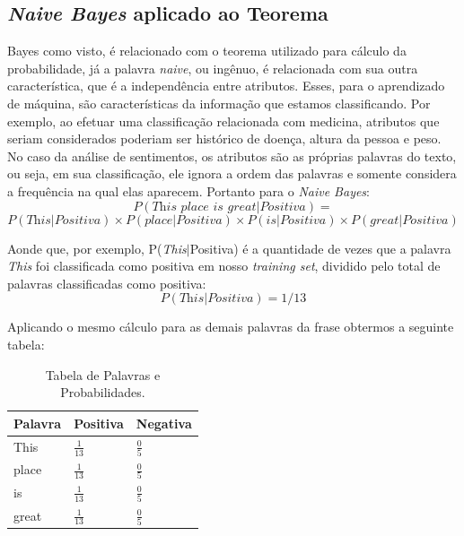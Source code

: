 \subsection{\textit{Naive Bayes} aplicado ao Teorema}

Bayes como visto, é relacionado com o teorema utilizado para cálculo da
probabilidade, já a palavra \textit{naive}, ou ingênuo, é relacionada com sua
outra característica, que é a
independência entre atributos. Esses, para o aprendizado de máquina, são
características da informação que estamos classificando. Por exemplo, ao efetuar uma classificação relacionada com medicina, atributos que seriam considerados poderiam ser histórico de doença, altura da pessoa e peso. No caso da análise de sentimentos, os atributos
são as próprias palavras do texto, ou seja, em sua classificação, ele ignora a
ordem das palavras e somente considera a frequência na qual elas aparecem.
Portanto para o \textit{Naive Bayes}:
\[ P(\textit{This place is great}|Positiva) =\]\[ P(\textit{This}|Positiva) \times
P(\textit{place}|Positiva) \times P(\textit{is}|Positiva) \times
P(\textit{great}|Positiva)
\]

Aonde que, por exemplo, P(\textit{This}$\vert$Positiva) é a quantidade de vezes que a
palavra \textit{This} foi classificada como positiva em nosso \textit{training
set}, dividido pelo total de palavras classificadas como positiva:
\[P(\textit{This}|Positiva) = 1 / 13\]

Aplicando o mesmo cálculo para as demais palavras da frase obtermos a seguinte
tabela:
\begin{table}[htb]
\centering
\renewcommand{\arraystretch}{1.5}%
\begin{tabular}{lll}
\hline

Palavra & Positiva & Negativa \\ \hline
This & \large $\frac{1}{13}$ & \large $\frac{0}{5}$ \\
place & \large $\frac{1}{13}$ & \large $\frac{0}{5}$ \\
is & \large $\frac{1}{13}$ & \large $\frac{0}{5}$ \\
great & \large $\frac{1}{13}$ & \large $\frac{0}{5}$ \\
\end{tabular}
\caption{Tabela de Palavras e Probabilidades.}
\label{tab:probabilidadesnb}
\end{table}

